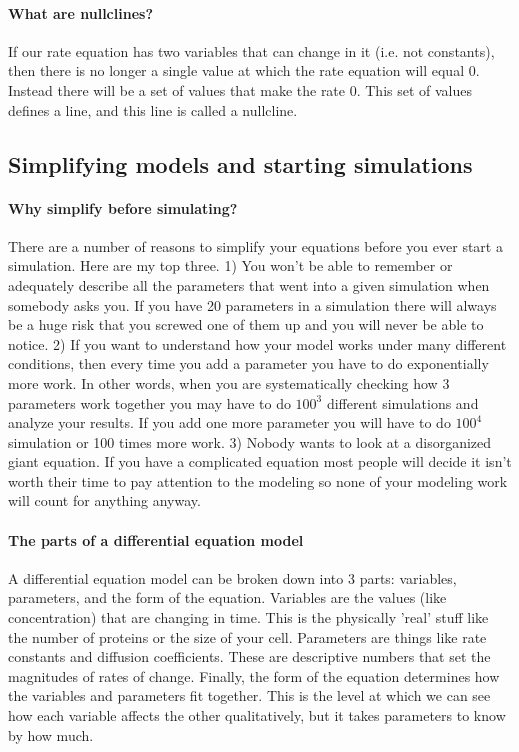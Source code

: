 \paragraph{What are nullclines?} If our rate equation has two variables that can change in it (i.e. not constants), then there is no longer a single value at which the rate equation will equal 0.  Instead there will be a set of values that make the rate 0.  This set of values defines a line, and this line is called a nullcline. 
% 



\subsection{Simplifying models and starting simulations}
\paragraph{Why simplify before simulating?} There are a number of reasons to simplify your equations before you ever start a simulation.  Here are my top three.  
1) You won't be able to remember or adequately describe all the parameters that went into a given simulation when somebody asks you.  If you have 20 parameters in a simulation there will always be a huge risk that you screwed one of them up and you will never be able to notice.  
2) If you want to understand how your model works under many different conditions, then every time you add a parameter you have to do exponentially more work.  In other words, when you are systematically checking how 3 parameters work together you may have to do $100^3$ different simulations and analyze your results.  If you add one more parameter you will have to do $100^4$ simulation or 100 times more work.  
3) Nobody wants to look at a disorganized giant equation.  If you have a complicated equation most people will decide it isn't worth their time to pay attention to the modeling so none of your modeling work will count for anything anyway.

\paragraph{The parts of a differential equation model} A differential equation model can be broken down into 3 parts: variables, parameters, and the form of the equation.  Variables are the values (like concentration) that are changing in time.  This is the physically 'real' stuff like the number of proteins or the size of your cell.  Parameters are things like rate constants and diffusion coefficients.  These are descriptive numbers that set the magnitudes of rates of change.  Finally, the form of the equation determines how the variables and parameters fit together.  This is the level at which we can see how each variable affects the other qualitatively, but it takes parameters to know by how much.

